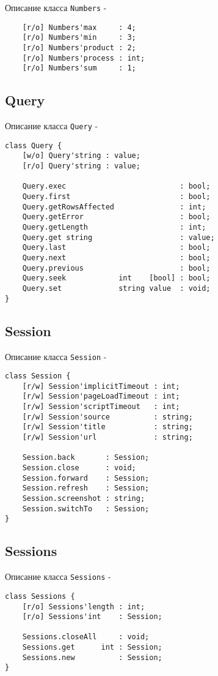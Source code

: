 \noindent Описание класса \texttt{Numbers} -
\begin{verbatim}
    [r/o] Numbers'max     : 4;
	[r/o] Numbers'min     : 3;
	[r/o] Numbers'product : 2;
	[r/o] Numbers'process : int;
	[r/o] Numbers'sum     : 1;
\end{verbatim}

\subsection{{\color{orange} Query}}

\noindent Описание класса \texttt{Query} -
\begin{verbatim}
class Query {
    [w/o] Query'string : value;
	[r/o] Query'string : value;
	
    Query.exec                          : bool;
	Query.first                         : bool;
	Query.getRowsAffected               : int;
	Query.getError                      : bool;
	Query.getLength                     : int;
	Query.get string                    : value;
	Query.last                          : bool;
	Query.next                          : bool;
	Query.previous                      : bool;
	Query.seek            int    [bool] : bool;
	Query.set             string value  : void;
}
\end{verbatim}

\subsection{{\color{orange} Session}}

\noindent Описание класса \texttt{Session} -
\begin{verbatim}
class Session {
    [r/w] Session'implicitTimeout : int;
	[r/w] Session'pageLoadTimeout : int;
	[r/w] Session'scriptTimeout   : int;
	[r/w] Session'source          : string;
	[r/w] Session'title           : string;
	[r/w] Session'url             : string;
	
    Session.back       : Session;
	Session.close      : void;
	Session.forward    : Session;
	Session.refresh    : Session;
	Session.screenshot : string;
	Session.switchTo   : Session;
}
\end{verbatim}

\subsection{{\color{orange} Sessions}}

\noindent Описание класса \texttt{Sessions} -
\begin{verbatim}
class Sessions {
    [r/o] Sessions'length : int;
	[r/o] Sessions'int    : Session;
	
    Sessions.closeAll     : void;
	Sessions.get      int : Session;
	Sessions.new          : Session;
}
\end{verbatim}


